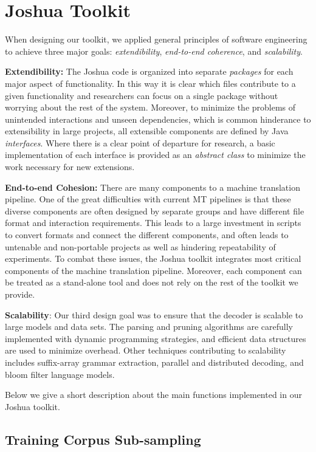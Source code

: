 \documentclass[11pt]{article}
\begin{document}
\section{Joshua Toolkit}
When designing our toolkit,  we applied general principles of software engineering to achieve three major goals: \emph{extendibility}, \emph{end-to-end coherence}, and \emph{scalability}.

\textbf{Extendibility:} The Joshua code is organized into separate \emph{packages} for each major aspect of functionality. In this way it is clear which files contribute to a given functionality and researchers can focus on a single package without worrying about the rest of the system. Moreover, to minimize the problems of unintended interactions and unseen dependencies, which is common hinderance to extensibility in large projects, all extensible components are defined by Java \emph{interfaces}. Where there is a clear point of departure for research, a basic implementation of each interface is provided as an \emph{abstract class} to minimize the work necessary for new extensions.

\textbf{End-to-end Cohesion:} There are many components to a machine translation pipeline. One of the great difficulties with current MT pipelines is that these diverse components are often designed by separate groups and have different file format and interaction requirements. This leads to a large investment in scripts to convert formats and connect the different components, and often leads to untenable and non-portable projects as well as hindering repeatability of experiments.
To combat these issues, the Joshua toolkit integrates most critical components of the machine translation pipeline. Moreover, each component can be treated as a stand-alone tool and does not rely on the rest of the toolkit we provide.

\textbf{Scalability}: Our third design goal was to ensure that the decoder is scalable to large models and data sets. The parsing and pruning algorithms are carefully implemented with dynamic programming strategies, and efficient data structures are used to minimize overhead. Other techniques contributing to scalability includes suffix-array grammar extraction, parallel and distributed decoding, and bloom filter language models.

Below we give a short description about the main functions implemented in our Joshua toolkit.

\subsection{Training Corpus Sub-sampling}\label{subsampling} 
\end{document}
